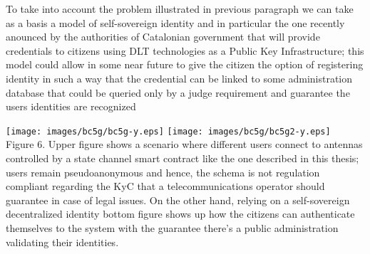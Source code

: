 \documentclass[12pt]{amsart}
\begin{document}
\begin{multicols}{2}
\vspace{0.35cm}

To take into account the problem illustrated in previous paragraph
we can take as a basis a model of self-sovereign identity\cite{allen}
and in particular the one recently anounced by the authorities
of Catalonian government\cite{identicat} that will provide credentials
to citizens using DLT technologies as a Public Key Infrastructure; this
model could allow in some near future to give the citizen the option
of registering identity in such a way that the credential can be linked
to some administration database that could be queried only by a judge
requirement and guarantee the users identities are recognized



\end{multicols}

\begin{center}
  \texttt{[image: images/bc5g/bc5g-y.eps]}
  \texttt{[image: images/bc5g/bc5g2-y.eps]}
\\
Figure 6. Upper figure shows a scenario where different users connect
to antennas controlled by a state channel smart contract like the one
described in this thesis; users remain pseudoanonymous and hence, the
schema is not regulation compliant regarding the KyC that a
telecommunications
operator should guarantee in case of legal issues. On the other hand,
relying on a self-sovereign decentralized identity bottom figure shows
up how the citizens can authenticate themselves to the system with the
guarantee there's a public administration validating their identities.
\\
\end{center}
\end{document}
